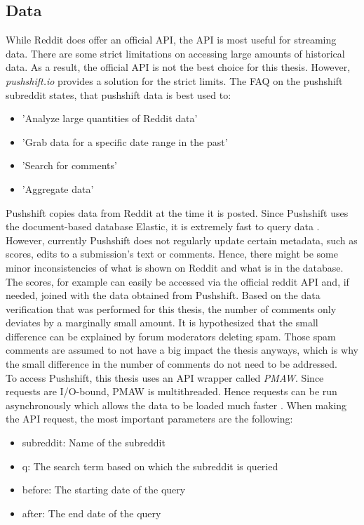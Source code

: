 \documentclass[11pt, a4paper]{article}
\begin{document}
\subsection{Data} \label{subs:data}

While Reddit does offer an official API, the API is most useful for streaming data. 
There are some strict limitations on accessing large amounts of historical data. As a result, the official API is not the best choice for this thesis. 
However, \emph{pushshift.io} provides a solution for the strict limits.
The FAQ on the pushshift subreddit states, that pushshift data is best used to:
\begin{itemize}
    \item 'Analyze large quantities of Reddit data'
    \item 'Grab data for a specific date range in the past'
    \item 'Search for comments'
    \item 'Aggregate data'
\end{itemize}

Pushshift copies data from Reddit at the time it is posted. Since Pushshift uses the document-based database Elastic, it is extremely fast to query data \citep{elastic2015}. However, currently Pushshift does not regularly update certain metadata, such as scores, edits to a submission’s text or comments. Hence, there might be some minor inconsistencies of what is shown on Reddit and what is in the database. The scores, for example can easily be accessed via the official reddit API and, if needed, joined with the data obtained from Pushshift. Based on the data verification that was performed for this thesis, the number of comments only deviates by a marginally small amount. It is hypothesized that the small difference can be explained by forum moderators deleting spam. Those spam comments are assumed to not have a big impact the thesis anyways, which is why the small difference in the number of comments do not need to be addressed. \\
To access Pushshift, this thesis uses an API wrapper called \emph{PMAW}. Since requests are I/O-bound, PMAW is multithreaded. Hence requests can be run asynchronously which allows the data to be loaded much faster \citep{pmaw2021}.
When making the API request, the most important parameters are the following:
\begin{itemize}
    \item subreddit: Name of the subreddit
    \item q: The search term based on which the subreddit is queried
    \item before: The starting date of the query
    \item after: The end date of the query
\end{itemize}
\end{document}
